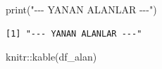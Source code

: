 \documentclass[
  11pt,
  a4paper,
  DIV=11,
  numbers=noendperiod]{scrartcl}
\newenvironment{Shaded}{\begin{snugshade}}{\end{snugshade}}
\newcommand{\FunctionTok}[1]{\textcolor[rgb]{0.28,0.35,0.67}{#1}}
\newcommand{\NormalTok}[1]{\textcolor[rgb]{0.00,0.23,0.31}{#1}}
\newcommand{\SpecialCharTok}[1]{\textcolor[rgb]{0.37,0.37,0.37}{#1}}
\newcommand{\StringTok}[1]{\textcolor[rgb]{0.13,0.47,0.30}{#1}}
\begin{document}
\begin{Shaded}
\begin{Highlighting}[]
\FunctionTok{print}\NormalTok{(}\StringTok{"{-}{-}{-} YANAN ALANLAR {-}{-}{-}"}\NormalTok{)}
\end{Highlighting}
\end{Shaded}

\begin{verbatim}
[1] "--- YANAN ALANLAR ---"
\end{verbatim}

\begin{Shaded}
\begin{Highlighting}[]
\NormalTok{knitr}\SpecialCharTok{::}\FunctionTok{kable}\NormalTok{(df\_alan)}
\end{Highlighting}
\end{Shaded}
\end{document}

